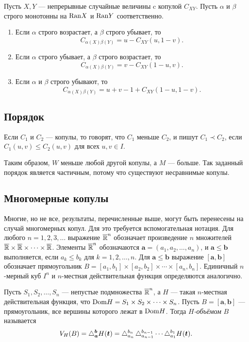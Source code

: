\begin{theorem}
	Пусть $X, Y$ --- непрерывные случайные величины c копулой $C_{XY}$. Пусть $\alpha$ и $\beta$ строго монотонны на $\mathrm{Ran}{X}$ и $\mathrm{Ran}{Y}$ соответственно.
	\begin{enumerate}
	\item Если $\alpha$ строго возрастает, а $\beta$ строго убывает, то
	\[
	C_{\alpha(X)\beta(Y)} = u - C_{XY}(u, 1 - v).
	\]
	\item Если $\alpha$ строго убывает, а $\beta$ строго возрастает, то
	\[
	C_{\alpha(X)\beta(Y)} = v - C_{XY}(1 - u, v).
	\]
	\item Если $\alpha$ и $\beta$ строго убывают, то
	\[
	C_{\alpha(X)\beta(Y)} = u + v - 1 + C_{XY}(1 - u, 1 - v).
	\]
	\end{enumerate}
\end{theorem}

\subsection*{Порядок}

\begin{define}
	Если $C_1$ и $C_2$ --- копулы, то говорят, что $C_1$ меньше $C_2$, и пишут $C_1 \prec C_2$, если $C_1(u, v) \leqslant C_2(u, v)$ для всех $u, v \in I$.
\end{define}

Таким образом, $W$ меньше любой другой копулы, а $M$ --- больше. Так заданный порядок является частичным, потому что существуют несравнимые копулы.

\subsection*{Многомерные копулы}

Многие, но не все, результаты, перечисленные выше, могут быть перенесены на случай многомерных копул. Для это требуется вспомогательная нотация. Для любого $n = 1, 2, 3, \ldots$ выражение $\overline{\mathbb{R}}^n$ обозначает произведение $n$ множителей $\overline{\mathbb{R}} \times \overline{\mathbb{R}} \times \cdots \times \overline{\mathbb{R}}$. Элементы $\overline{\mathbb{R}}^n$ обозначаются $\bm{a} = (a_1, a_2, \ldots, a_n)$, и $\bm{a} \leqslant \bm{b}$ выполняется, если $a_k \leqslant b_k$ для $k = 1, 2, \ldots, n$. Для $\bm{a} \leqslant \bm{b}$ выражение $[\bm{a}, \bm{b}]$ обозначает прямоугольник $B = [a_1, b_1] \times [a_2, b_2] \times \cdots \times [a_n, b_n]$. Единичный $n$-мерный куб $I^n$ и $n$-местная действительная функция определяются аналогично.

\begin{define}
	Пусть $S_1, S_2, \ldots, S_n$ --- непустые подмножества $\overline{\mathbb{R}}^n$, а $H$ --- такая $n$-местная действительная функция, что $\mathrm{Dom}{H} = S_1 \times S_2 \times \cdots \times S_n$. Пусть $B = [\bm{a}, \bm{b}]$ --- прямоугольник, все вершины которого лежат в $\mathrm{Dom}{H}$. Тогда \emph{$H$-объёмом} $B$ называется
\[
V_H(B) = \mathop{}\!\mathbin\bigtriangleup_{\bm{a}}^{\bm{b}}H(\bm{t}) = \mathop{}\!\mathbin\bigtriangleup_{a_n}^{b_n}\mathop{}\!\mathbin\bigtriangleup_{a_{n-1}}^{b_{n-1}}\cdots\mathop{}\!\mathbin\bigtriangleup_{a_1}^{b_1}H(\bm{t}).
\]
\end{define}

